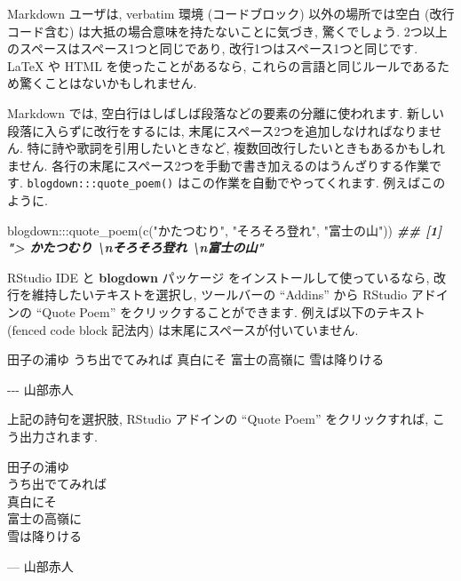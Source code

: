 \documentclass[
  11pt,
  lualatex,
  ja=standard]{bxjsreport}
\newenvironment{Shaded}{\begin{snugshade}}{\end{snugshade}}
\newcommand{\DocumentationTok}[1]{\textcolor[rgb]{0.56,0.35,0.01}{\textbf{\textit{#1}}}}
\newcommand{\FunctionTok}[1]{\textcolor[rgb]{0.00,0.00,0.00}{#1}}
\newcommand{\NormalTok}[1]{#1}
\newcommand{\SpecialCharTok}[1]{\textcolor[rgb]{0.00,0.00,0.00}{#1}}
\newcommand{\StringTok}[1]{\textcolor[rgb]{0.31,0.60,0.02}{#1}}
\renewenvironment{quote}{\def\FrameCommand{{\color{quotebarcolor}{\vrule width 3pt}}\hspace{10pt}}\MakeFramed{\advance\hsize-\width\FrameRestore}}{\endMakeFramed}
\begin{document}
Markdown ユーザは, verbatim 環境 (コードブロック) 以外の場所では空白 (改行コード含む) は大抵の場合意味を持たないことに気づき, 驚くでしょう. 2つ以上のスペースはスペース1つと同じであり, 改行1つはスペース1つと同じです. LaTeX や HTML を使ったことがあるなら, これらの言語と同じルールであるため驚くことはないかもしれません.

Markdown では, 空白行はしばしば段落などの要素の分離に使われます. 新しい段落に入らずに改行をするには, 末尾にスペース2つを追加しなければなりません. 特に詩や歌詞を引用したいときなど, 複数回改行したいときもあるかもしれません. 各行の末尾にスペース2つを手動で書き加えるのはうんざりする作業です. \texttt{blogdown:::quote\_poem()} はこの作業を自動でやってくれます. 例えばこのように.

\begin{Shaded}
\begin{Highlighting}[numbers=left,,]
\NormalTok{blogdown}\SpecialCharTok{:::}\FunctionTok{quote\_poem}\NormalTok{(}\FunctionTok{c}\NormalTok{(}\StringTok{"かたつむり"}\NormalTok{, }\StringTok{"そろそろ登れ"}\NormalTok{, }
  \StringTok{"富士の山"}\NormalTok{))}
\DocumentationTok{\#\# [1] "\textgreater{} かたつむり  \textbackslash{}nそろそろ登れ  \textbackslash{}n富士の山"}
\end{Highlighting}
\end{Shaded}

RStudio IDE と \textbf{blogdown} パッケージ \autocite{R-blogdown} をインストールして使っているなら, 改行を維持したいテキストを選択し, ツールバーの ``Addins'' から RStudio アドインの ``Quote Poem'' をクリックすることができます. 例えば以下のテキスト (fenced code block 記法内) は末尾にスペースが付いていません.

\begin{Shaded}
\begin{Highlighting}[]
\NormalTok{田子の浦ゆ}
\NormalTok{うち出でてみれば}
\NormalTok{真白にそ}
\NormalTok{富士の高嶺に}
\NormalTok{雪は降りける}

\NormalTok{{-}{-}{-} 山部赤人}
\end{Highlighting}
\end{Shaded}

上記の詩句を選択肢, RStudio アドインの ``Quote Poem'' をクリックすれば, こう出力されます.

\begin{quote}
田子の浦ゆ\\
うち出でてみれば\\
真白にそ\\
富士の高嶺に\\
雪は降りける

\begin{flushright}
--- 山部赤人

\end{flushright}
\end{quote}
\end{document}

